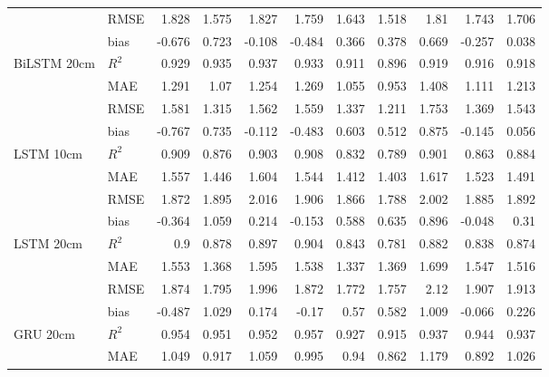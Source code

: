\begin{tabular}{llrrrrrrrrr}
                                     & RMSE  &  1.828 & 1.575 &  1.827 &  1.759 & 1.643 &  1.518 & 1.81  &  1.743 &     1.706 \\
                                     & bias  & -0.676 & 0.723 & -0.108 & -0.484 & 0.366 &  0.378 & 0.669 & -0.257 &     0.038 \\
 BiLSTM 20cm                         & $R^2$ &  0.929 & 0.935 &  0.937 &  0.933 & 0.911 &  0.896 & 0.919 &  0.916 &     0.918 \\
                                     & MAE   &  1.291 & 1.07  &  1.254 &  1.269 & 1.055 &  0.953 & 1.408 &  1.111 &     1.213 \\
                                     & RMSE  &  1.581 & 1.315 &  1.562 &  1.559 & 1.337 &  1.211 & 1.753 &  1.369 &     1.543 \\
                                     & bias  & -0.767 & 0.735 & -0.112 & -0.483 & 0.603 &  0.512 & 0.875 & -0.145 &     0.056 \\
 LSTM 10cm                           & $R^2$ &  0.909 & 0.876 &  0.903 &  0.908 & 0.832 &  0.789 & 0.901 &  0.863 &     0.884 \\
                                     & MAE   &  1.557 & 1.446 &  1.604 &  1.544 & 1.412 &  1.403 & 1.617 &  1.523 &     1.491 \\
                                     & RMSE  &  1.872 & 1.895 &  2.016 &  1.906 & 1.866 &  1.788 & 2.002 &  1.885 &     1.892 \\
                                     & bias  & -0.364 & 1.059 &  0.214 & -0.153 & 0.588 &  0.635 & 0.896 & -0.048 &     0.31  \\
 LSTM 20cm                           & $R^2$ &  0.9   & 0.878 &  0.897 &  0.904 & 0.843 &  0.781 & 0.882 &  0.838 &     0.874 \\
                                     & MAE   &  1.553 & 1.368 &  1.595 &  1.538 & 1.337 &  1.369 & 1.699 &  1.547 &     1.516 \\
                                     & RMSE  &  1.874 & 1.795 &  1.996 &  1.872 & 1.772 &  1.757 & 2.12  &  1.907 &     1.913 \\
                                     & bias  & -0.487 & 1.029 &  0.174 & -0.17  & 0.57  &  0.582 & 1.009 & -0.066 &     0.226 \\
 GRU 20cm                            & $R^2$ &  0.954 & 0.951 &  0.952 &  0.957 & 0.927 &  0.915 & 0.937 &  0.944 &     0.937 \\
                                     & MAE   &  1.049 & 0.917 &  1.059 &  0.995 & 0.94  &  0.862 & 1.179 &  0.892 &     1.026 \\

\end{tabular}
